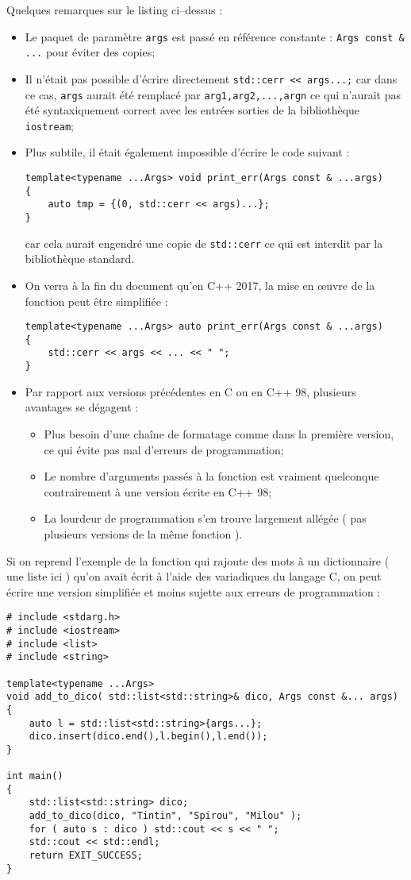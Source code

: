\documentclass[a4]{article}
\begin{document}
Quelques remarques sur le listing ci--dessus :
\begin{itemize}
\item Le paquet de paramètre \verb$args$ est passé en référence constante : \verb$Args const & ...$ pour éviter des copies;
\item Il n'était pas possible d'écrire directement \verb$std::cerr << args...;$ car dans ce cas, \verb$args$ aurait été
remplacé par \verb$arg1,arg2,...,argn$ ce qui n'aurait pas été syntaxiquement correct avec les entrées sorties de la bibliothèque
\verb$iostream$;
\item Plus subtile, il était également impossible d'écrire le code suivant :
\begin{lstlisting}
template<typename ...Args> void print_err(Args const & ...args)
{
    auto tmp = {(0, std::cerr << args)...};
} 
\end{lstlisting}
car cela aurait engendré une copie de \verb$std::cerr$ ce qui est interdit par la bibliothèque standard.
\item On verra à la fin du document qu'en C++ 2017, la mise en {\oe}uvre de la fonction peut être simplifiée :
\begin{lstlisting}
template<typename ...Args> auto print_err(Args const & ...args)
{
    std::cerr << args << ... << " ";
}
\end{lstlisting}
\item Par rapport aux versions précédentes en C ou en C++ 98, plusieurs avantages se dégagent : 
\begin{itemize}
\item Plus besoin d'une chaîne de formatage comme dans la première version, ce qui évite pas mal d'erreurs de programmation;
\item Le nombre d'arguments passés à la fonction est vraiment quelconque  contrairement à une version écrite en C++ 98;
\item La lourdeur de programmation s'en trouve largement allégée ( pas plusieurs versions de la même fonction ).
\end{itemize}
\end{itemize}

Si on reprend l'exemple de la fonction qui rajoute des mots à un dictionnaire ( une liste ici ) qu'on avait écrit à l'aide des variadiques du langage C, on peut écrire
une version simplifiée et moins sujette aux erreurs de programmation :

\begin{lstlisting}
# include <stdarg.h>
# include <iostream>
# include <list>
# include <string>

template<typename ...Args>
void add_to_dico( std::list<std::string>& dico, Args const &... args)
{
    auto l = std::list<std::string>{args...};
    dico.insert(dico.end(),l.begin(),l.end());
}

int main()
{
    std::list<std::string> dico;
    add_to_dico(dico, "Tintin", "Spirou", "Milou" );
    for ( auto s : dico ) std::cout << s << " ";
    std::cout << std::endl;
    return EXIT_SUCCESS;
}
\end{lstlisting}
\end{document}
